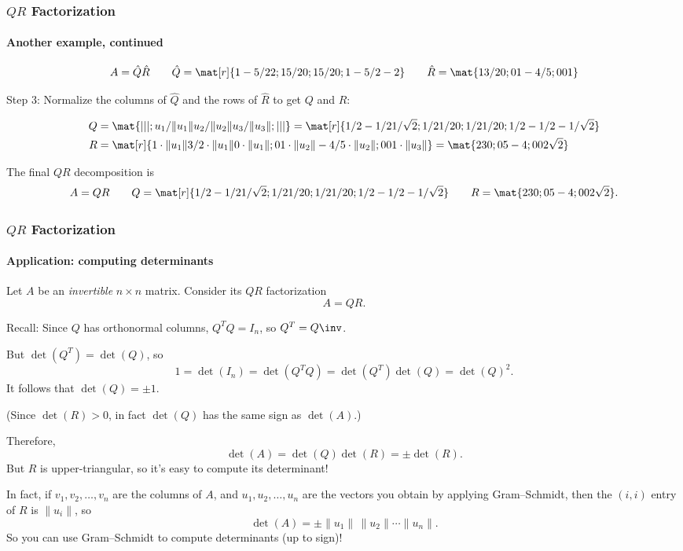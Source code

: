 
\begin{frame}
\frametitle{$QR$ Factorization}
\framesubtitle{Another example, continued}

\vskip-3mm
\displayskips{3pt}
\[ A = \hat Q\hat R 
\qquad \hat Q = \mat[r]{1 -5/2 2; 1 5/2 0; 1 5/2 0; 1 -5/2 -2}
\qquad \hat R = \mat{1 3/2 0; 0 1 -4/5; 0 0 1}
\]

\alert{Step 3:} Normalize the columns of $\hat Q$ and the rows of $\hat R$ to
get $Q$ and $R$:
\begin{webonly}
  \[\begin{split}
    Q &= \mat{| | |; u_1/\|u_1\| u_2/\|u_2\| u_3/\|u_3\|; | | |} 
    = \mat[r]{1/2 -1/2 1/\sqrt 2; 1/2 1/2 0; 1/2 1/2 0; 1/2 -1/2 -1/\sqrt 2} \\
    R &= \mat[r]{
      1\cdot\|u_1\| 3/2\cdot\|u_1\| 0\cdot\|u_1\|;
      0  1\cdot\|u_2\|  -4/5\cdot\|u_2\|;
      0  0  1\cdot\|u_3\|
    } =
    \mat{2 3 0; 0 5 -4; 0 0 2\sqrt 2}
  \end{split}\]
\end{webonly}

\pause\medskip
The final $QR$ decomposition is
\[ A = QR \qquad
Q = \mat[r]{1/2 -1/2 1/\sqrt 2; 1/2 1/2 0; 1/2 1/2 0; 1/2 -1/2 -1/\sqrt 2}
\qquad
R = \mat{2 3 0; 0 5 -4; 0 0 2\sqrt 2}.
\]

\end{frame}



\begin{frame}
\frametitle{$QR$ Factorization}
\framesubtitle{Application: computing determinants}

\vskip-1mm
Let $A$ be an \emph{invertible} $n\times n$ matrix.  Consider its $QR$
factorization
\[ A = QR. \]

\pause
\alert{Recall:} Since $Q$ has orthonormal columns, $Q^TQ = I_n$, so
$Q^T=Q\inv$.

\pause\smallskip
But $\det(Q^T)=\det(Q)$, so
\[ 1 = \det(I_n) = \det(Q^TQ) = \det(Q^T)\det(Q) = \det(Q)^2. \]
\pause
It follows that $\det(Q)=\pm1$.

\pause\smallskip
(Since $\det(R)>0$, in fact $\det(Q)$ has the same sign as $\det(A)$.)

\pause\medskip
Therefore,
\[ \det(A) = \det(Q)\det(R) = \pm\det(R). \]
\pause
But $R$ is upper-triangular, so it's easy to compute its determinant!

\pause\medskip
In fact, if $v_1,v_2,\ldots,v_n$ are the columns of $A$, and
$u_1,u_2,\ldots,u_n$ are the vectors you obtain by applying Gram--Schmidt, then
the $(i,i)$ entry of $R$ is $\|u_i\|$, so
\[ \det(A) = \pm\|u_1\|\,\|u_2\|\cdots\|u_n\|. \]
\pause
So you can use Gram--Schmidt to compute determinants (up to sign)!

\end{frame}


